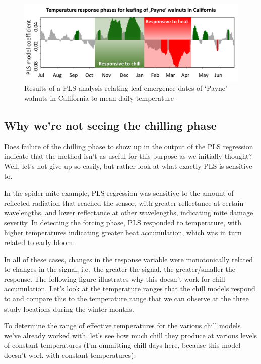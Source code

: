 \documentclass[
]{book}
\begin{document}
\begin{figure}
\centering
\includegraphics{pictures/PLS_Payne_Cali.png}
\caption{Results of a PLS analysis relating leaf emergence dates of `Payne' walnuts in California to mean daily temperature}
\end{figure}

\hypertarget{why-were-not-seeing-the-chilling-phase}{%
\subsection{Why we're not seeing the chilling phase}\label{why-were-not-seeing-the-chilling-phase}}

Does failure of the chilling phase to show up in the output of the PLS regression indicate that the method isn't as useful for this purpose as we initially thought? Well, let's not give up so easily, but rather look at what exactly PLS is sensitive to.

In the spider mite example, PLS regression was sensitive to the amount of reflected radiation that reached the sensor, with greater reflectance at certain wavelengths, and lower reflectance at other wavelengths, indicating mite damage severity. In detecting the forcing phase, PLS responded to temperature, with higher temperatures indicating greater heat accumulation, which was in turn related to early bloom.

In all of these cases, changes in the response variable were monotonically related to changes in the signal, i.e.~the greater the signal, the greater/smaller the response. The following figure illustrates why this doesn't work for chill accumulation. Let's look at the temperature ranges that the chill models respond to and compare this to the temperature range that we can observe at the three study locations during the winter months.

To determine the range of effective temperatures for the various chill models we've already worked with, let's see how much chill they produce at various levels of constant temperatures (I'm ommitting chill days here, because this model doesn't work with constant temperatures):
\end{document}
